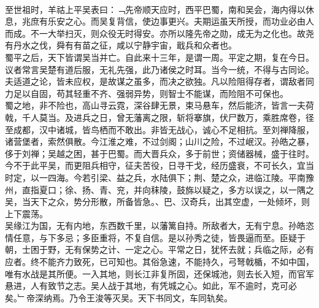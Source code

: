 {\\
至世祖时，羊祜上平吴表曰：﹁先帝顺天应时，西平巴蜀，南和吴会，海内得以休息，兆庶有乐安之心。而吴复背信，使边事更兴。夫期运虽天所授，而功业必由人而成。不一大举扫灭，则众役无时得安。亦所以隆先帝之勋，成无为之化也。故尧有丹水之伐，舜有有苗之征，咸以宁静宇宙，戢兵和众者也。\\
蜀平之后，天下皆谓吴当并亡。自此来十三年，是谓一周。平定之期，复在今日。议者常言吴楚有道后服，无礼先强，此乃诸侯之时耳。当今一统，不得与古同论。夫适道之论，皆未应权，是故谋之虽多，而决之欲独。凡以险阻得存者，谓敌者同力足以自固，苟其轻重不齐、强弱异势，则智士不能谋，而险阻不可保也。\\
蜀之地，非不险也，高山寻云霓，深谷肆无景，束马悬车，然后能济，皆言一夫荷戟，千人莫当。及进兵之日，曾无藩离之限，斩将搴旗，伏尸数万，乘胜席卷，径至成都，汉中诸城，皆鸟栖而不敢出。非皆无战心，诚心不足相抗。至刘禅降服，诸营堡者，索然俱散。今江淮之难，不过剑阁；山川之险，不过岷汉。孙皓之暴，侈于刘禅；吴越之困，甚于巴蜀。而大晋兵众，多于前世；资储器械，盛于往时。今不于此平吴，而更阻兵相守，征夫苦役，日寻干戈，经历盛衰，不可长久，宜当时定，以一四海。今若引梁、益之兵，水陆俱下；荆、楚之众，进临江陵。平南豫州，直指夏口；徐、扬、青、兖，并向秣陵，鼓旆以疑之，多方以误之，以一隅之吴，当天下之众，势分形散，所备皆急。、巴、汉奇兵，出其空虚，一处倾坏，则上下震荡。\\
吴缘江为国，无有内地，东西数千里，以藩篱自持。所敌者大，无有宁息。孙皓恣情任意，与下多忌；多臣重将，不复自信。是以孙秀之徒，皆畏逼而至。臣疑于朝，士困于野，无有保势之计、一定之心。平常之日，犹怀去就；兵临之际，必有应者。终不能齐力致死，已可知也。其俗急速，不能持久，弓弩戟楯，不如中国，唯有水战是其所便。一入其地，则长江非复所固，还保城池，则去长入短，而官军悬进，人有致节之志。吴人战于其地，有凭城之心。如此，军不逾时，克可必矣。﹂帝深纳焉。乃令王浚等灭吴。天下书同文，车同轨矣。
}
